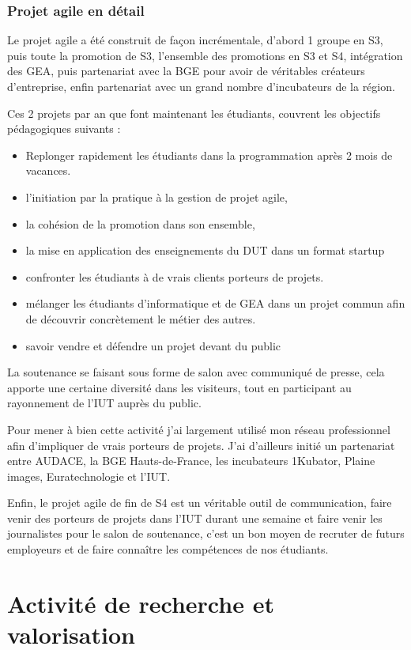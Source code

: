 \documentclass[a4paper]{article}
\begin{document}
\subsubsection{Projet agile en détail}

Le projet agile a été construit de façon incrémentale, d'abord 1 groupe en S3, puis toute la promotion de S3, l'ensemble des promotions en S3 et S4, intégration des GEA, puis partenariat avec la BGE pour avoir de véritables créateurs d'entreprise, enfin partenariat avec un grand nombre d'incubateurs de la région.

Ces 2 projets par an que font maintenant les étudiants, couvrent les objectifs pédagogiques suivants : 
\begin{itemize}
\item Replonger rapidement les étudiants dans la programmation après 2 mois de vacances.
\item l'initiation par la pratique à la gestion de projet agile,
\item la cohésion de la promotion dans son ensemble,
\item la mise en application des enseignements du DUT dans un format startup
\item confronter les étudiants à de vrais clients porteurs de projets.
\item mélanger les étudiants d'informatique et de GEA dans un projet commun afin de découvrir concrètement le métier des autres.
\item savoir vendre et défendre un projet devant du public 
\end{itemize}

La soutenance se faisant sous forme de salon avec communiqué de presse, cela apporte une certaine diversité dans les visiteurs, tout en participant au rayonnement de l'IUT auprès du public.

Pour mener à bien cette activité j'ai largement utilisé mon réseau professionnel afin d'impliquer de vrais porteurs de projets. 
J'ai d'ailleurs initié un partenariat entre AUDACE, la BGE Hauts-de-France, les incubateurs 1Kubator, Plaine images, Euratechnologie et l'IUT.

Enfin, le projet agile de fin de S4 est un véritable outil de communication, faire venir des porteurs de projets dans l'IUT durant une semaine et faire venir les journalistes pour le salon de soutenance, c'est un bon moyen de recruter de futurs employeurs et de faire connaître les compétences de nos étudiants.

\section{Activité de recherche et valorisation}
\end{document}

